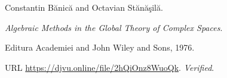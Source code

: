 Constantin B{\u a}nic{\u a} and Octavian St{\u a}n{\u a}{\c s}il{\u a}.

\newblock \emph{Algebraic Methods in the Global Theory of Complex Spaces}.

\newblock Editura Academiei and John Wiley and Sons, 1976.

\newblock URL \url{https://djvu.online/file/2hQiOnz8WuoQk}.
\newblock \emph{Verified}.

